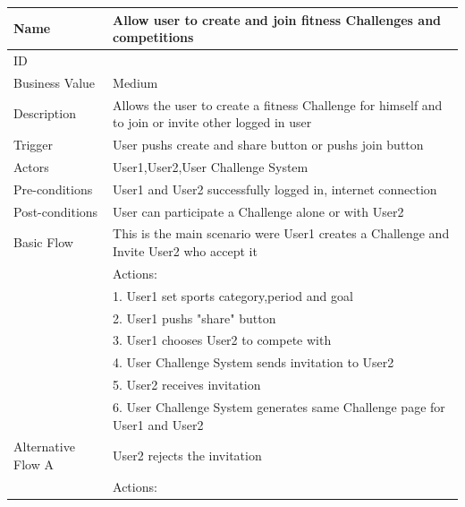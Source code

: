 \documentclass{article}
\begin{document}
\begin{table}[h!]
    \centering
    \small
    \begin{tabularx}{\textwidth}{|>{\raggedright\arraybackslash}p{}|X|}
        \hline
        Name             & Allow user to create and join fitness Challenges and competitions                               \\ \hline
        ID               &                                                                                      \\ \hline
        Business Value   & Medium                                                                                  \\ \hline
        Description      & Allows the user to create a fitness Challenge for himself and to join or invite other logged in user\\ \hline
        Trigger          & User pushs create and share button or pushs join button \\ \hline
        Actors           & User1,User2,User Challenge System                        \\ \hline
        Pre-conditions   & User1 and User2 successfully logged in, internet connection                                  \\ \hline
        Post-conditions  & User can participate a Challenge alone or with User2                                                        \\ \hline
        Basic Flow       & This is the main scenario were User1 creates a Challenge and Invite User2 who accept it\\ \hline
                         & Actions: \\
                         & 1. User1 set sports category,period and goal\\
                         & 2. User1 pushs "share" button \\
                         & 3. User1 chooses User2 to compete with\\
                         & 4. User Challenge System sends invitation to User2 \\
                         & 5. User2 receives invitation\\
                         & 6. User Challenge System generates same Challenge page for User1 and User2 \\ \hline
        Alternative Flow A & User2 rejects the invitation\\
                         & Actions: \\

\end{tabularx}
\end{table}
\end{document}
